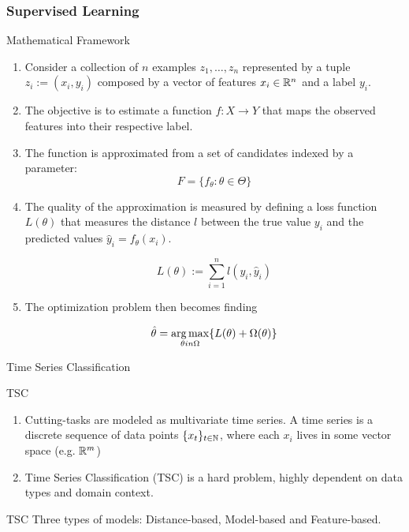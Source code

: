 \begin{frame}[allowframebreaks]
    \frametitle{Supervised Learning}
    \begin{alertblock}{Mathematical Framework}
        \begin{enumerate}
            \item  Consider a collection of $n$ examples $z_1,\dots, z_n$ represented by a tuple $z_i:= (x_i, y_i)$
         composed by a vector of features $x_i\in \mathbb{R}^n$ and a label $y_i$.\\
      
         \item The objective is to estimate a function $f: X \rightarrow Y$ that maps the observed features into
            their respective label. \\
      
         \item The function is approximated from a set of candidates indexed by a parameter:
          $$
          F = \{ f_{\theta} : \theta \in \Theta\}
          $$
      
         \item The quality of the approximation is measured by defining a loss function $L(\theta)$ that measures
          the distance $l$ between the true value $y_i$ and the predicted values $\hat y_i = f_{\theta}(x_i)$.
      
          $$
              L(\theta):= \sum_{i=1}^n l(y_i, \hat y_i)
          $$
          
          
         \item  The optimization problem then becomes finding 
          
          $$
          \hat \theta = \argmax_{\theta in \Omega} \{ L(\theta)+ \Omega(\theta) \}
          $$
      
        \end{enumerate}
    \end{alertblock}
\end{frame}


\begin{frame}{Time Series Classification}

    \begin{alertblock}{TSC}
\begin{enumerate}
    \item Cutting-tasks are modeled as multivariate time series. A time series is a discrete sequence of data points $\{x_t\}_{t\in \mathbb{N}}$, where each $x_i$ lives in some vector space (e.g. $\mathbb{R}^m$)
    \item Time Series Classification (TSC) is a hard problem, highly dependent on data types and domain context.
\end{enumerate}
    \end{alertblock}
    \begin{alertblock}{TSC}
    Three types of models: Distance-based, Model-based and Feature-based.     
    \end{alertblock}
\end{frame}


